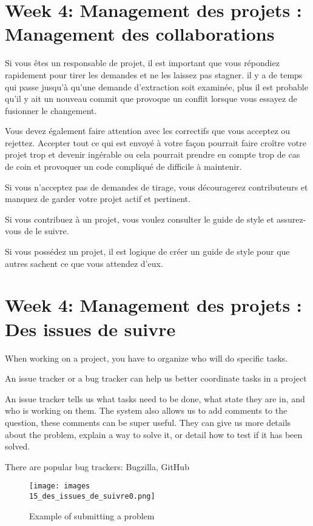 \documentclass[11pt, onecolumn]{article}
\begin{document}
\section{Week 4: Management des projets : Management des collaborations}

Si vous êtes un responsable de projet, il est important que vous répondiez rapidement pour tirer les demandes et ne les laissez pas stagner. il y a de temps qui passe jusqu'à qu'une demande d'extraction soit examinée, plus il est probable qu'il y ait un nouveau commit que provoque un conflit lorsque vous essayez de fusionner le changement. 

Vous devez également faire attention avec les correctifs que vous acceptez ou rejettez. Accepter tout ce qui est envoyé à votre façon pourrait faire croître votre projet trop et devenir ingérable ou cela pourrait prendre en compte trop de cas de coin et provoquer un code compliqué de difficile à maintenir.

Si vous n'acceptez pas de demandes de tirage, vous découragerez contributeurs et manquez de garder votre projet actif et pertinent. 

Si vous contribuez à un projet, vous voulez consulter le guide de style et assurez-vous de le suivre.

Si vous possédez un projet, il est logique de créer un guide de style pour que autres sachent ce que vous attendez d'eux. 


\section{Week 4: Management des projets : Des issues de suivre}

When working on a project, you have to organize who will do specific tasks.

An issue tracker or a bug tracker can help us better coordinate tasks in a project

An issue tracker tells us what tasks need to be done, what state they are in, and who is working on them. The system also allows us to add comments to the question, these comments can be super useful. They can give us more details about the problem, explain a way to solve it, or detail how to test if it has been solved.

There are popular bug trackers: Bugzilla, GitHub



\begin{figure}[h]
\begin{center}
\texttt{[image: images\\15\_des\_issues\_de\_suivre0.png]}
\end{center}
\caption{Example of submitting a problem}
\label{15_des_issues_de_suivre0}
\end{figure}
\end{document}
